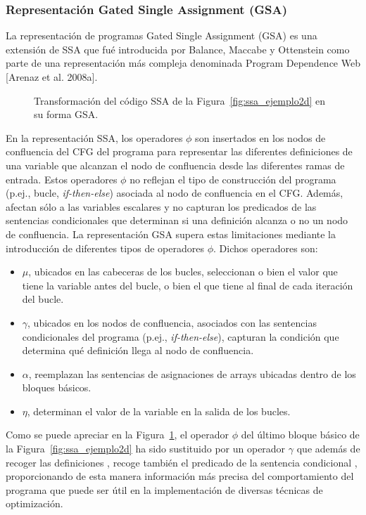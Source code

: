 %
\subsubsection*{Representación Gated Single Assignment (GSA)}
La representación de programas Gated Single Assignment (GSA) es una extensión de SSA que fué introducida por Balance, Maccabe y Ottenstein como parte de una representación más compleja denominada Program Dependence Web [Arenaz et al. 2008a].
%
%
\begin{figure}[t]
\begin{center}
\caption{Transformación del código SSA de la Figura~\ref{fig:ssa_ejemplo2d} en su forma GSA.}
\label{fig:gsa_ejemplo}
\end{center}
\end{figure}
%

En la representación SSA, los operadores $\phi$ son insertados en los nodos de confluencia del CFG del programa para representar las diferentes definiciones de una variable que alcanzan el nodo de confluencia desde las diferentes ramas de entrada.
Estos operadores $\phi$ no reflejan el tipo de construcción del programa (p.ej., bucle, \emph{if-then-else}) asociada al nodo de confluencia en el CFG. Además, afectan sólo a las variables escalares y no capturan los predicados de las sentencias condicionales que determinan si una definición alcanza o no un nodo de confluencia. La representación GSA supera estas limitaciones mediante la introducción de diferentes tipos de operadores $\phi$. Dichos operadores son:
%
\begin{itemize}
\item $\mu$, ubicados en las cabeceras de los bucles, seleccionan o bien el valor que tiene la variable antes del bucle, o bien el que tiene al final de cada iteración del bucle.
\item $\gamma$, ubicados en los nodos de confluencia, asociados con las sentencias condicionales del programa (p.ej., \emph{if-then-else}), capturan la condición que determina qué definición llega al nodo de confluencia.
\item $\alpha$, reemplazan las sentencias de asignaciones de arrays ubicadas dentro de los bloques básicos.
\item $\eta$, determinan el valor de la variable en la salida de los bucles.
\end{itemize}

Como se puede apreciar en la Figura~\ref{fig:gsa_ejemplo}, el operador $\phi$ del último bloque básico de la Figura~\ref{fig:ssa_ejemplo2d} ha sido sustituido por un operador $\gamma$ que además de recoger las definiciones , recoge también el predicado de la sentencia condicional , proporcionando de esta manera información más precisa del comportamiento del programa que puede ser útil en la implementación de diversas técnicas de optimización.

